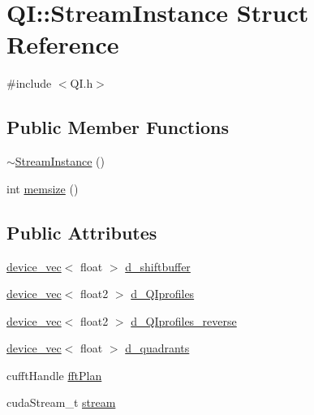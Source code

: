 \hypertarget{struct_q_i_1_1_stream_instance}{}\section{QI\+:\+:Stream\+Instance Struct Reference}
\label{struct_q_i_1_1_stream_instance}


{\ttfamily \#include $<$Q\+I.\+h$>$}

\subsection*{Public Member Functions}
\begin{DoxyCompactItemize}
\item 
\hyperlink{struct_q_i_1_1_stream_instance_a4baf4fa7918c42b08e383b86547fdf18}{$\sim$\+Stream\+Instance} ()
\item 
int \hyperlink{struct_q_i_1_1_stream_instance_afb6bbb4e6f3617fe5f687f1031ee465f}{memsize} ()
\end{DoxyCompactItemize}
\subsection*{Public Attributes}
\begin{DoxyCompactItemize}
\item 
\hyperlink{classdevice__vec}{device\+\_\+vec}$<$ float $>$ \hyperlink{struct_q_i_1_1_stream_instance_a724cb0eaf4dba31d223c091f24b01a16}{d\+\_\+shiftbuffer}
\item 
\hyperlink{classdevice__vec}{device\+\_\+vec}$<$ float2 $>$ \hyperlink{struct_q_i_1_1_stream_instance_a85870c63b71d751b2bda88c951cac3ec}{d\+\_\+\+Q\+Iprofiles}
\item 
\hyperlink{classdevice__vec}{device\+\_\+vec}$<$ float2 $>$ \hyperlink{struct_q_i_1_1_stream_instance_a81b60b3df49790dcfa8989e6b49f646e}{d\+\_\+\+Q\+Iprofiles\+\_\+reverse}
\item 
\hyperlink{classdevice__vec}{device\+\_\+vec}$<$ float $>$ \hyperlink{struct_q_i_1_1_stream_instance_a39936bfcb1d3852b71dd4e5311d78c34}{d\+\_\+quadrants}
\item 
cufft\+Handle \hyperlink{struct_q_i_1_1_stream_instance_acef1717596e0bd4e736707949d1e7d10}{fft\+Plan}
\item 
cuda\+Stream\+\_\+t \hyperlink{struct_q_i_1_1_stream_instance_a86a26550ce70d9da353d52c3d8945918}{stream}
\end{DoxyCompactItemize}


